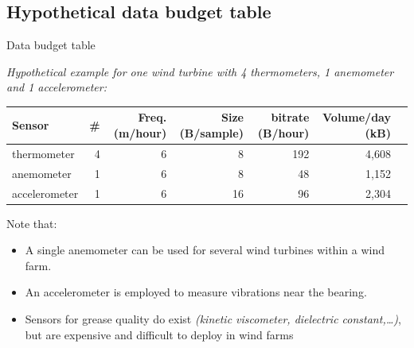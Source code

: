 \documentclass[aspectratio=169,xcolor=dvipsnames]{beamer}
\begin{document}
\subsection{Hypothetical data budget table}
\begin{frame}{Data budget table}

{\centering 
\textit{Hypothetical example for one wind turbine with 4 thermometers, 1 anemometer and 1 accelerometer:}
} \\[10pt]
{\small
    \begin{tabular}{l r r r r r l}
    \toprule
    Sensor & \# & Freq. (m/hour) & Size (B/sample) & bitrate (B/hour) & Volume/day (kB) \\
    \midrule
    thermometer     & 4 & 6 & 8     & 192   & 4,608  \\
    anemometer      & 1 & 6 & 8     & 48    & 1,152  \\
    accelerometer   & 1 & 6 & 16    & 96    & 2,304  \\
    \bottomrule
    \end{tabular}
}
\vfill
Note that: \\
\begin{itemize}
    \item A single anemometer can be used for several wind turbines within a wind farm.
    \item An accelerometer is employed to measure vibrations near the bearing.
    \item Sensors for grease quality do exist {\small \textit{(kinetic viscometer, dielectric constant,\dots)}}, but are expensive and difficult to deploy in wind farms 
\end{itemize}
\end{frame}
\end{document}
